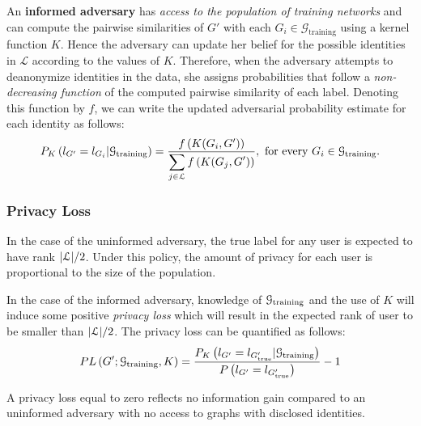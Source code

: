 An \textbf{informed adversary} has \emph{access to the population of training networks} and can compute the pairwise similarities of $ G' $ with each $ G_{i} \in \mathcal{G}_{\text{training}} $ using a kernel function $K$. Hence the adversary can update her belief for the possible identities in $ \mathcal{L} $ according to the values of $K$.
Therefore, when the adversary attempts to deanonymize identities in the data, she assigns probabilities that follow a \emph{non-decreasing function} {of the computed pairwise similarity} of each label.
Denoting this function by $f$, we can write the updated adversarial probability estimate for each identity as follows:
\[
	P_K\left(l_{G'} =l_{G_i}| \mathcal{G}_{\text{training}}\right) =  \frac{f\left(K(G_i, G')\right)}{\displaystyle \sum_{j\in \mathcal{L}}  f\left(K(G_j, G')\right)},   \mbox{ for every }  G_i \in \mathcal{G}_{\text{training}}.
	\label{eq:adversarial_rule}
\]




\subsubsection{Privacy Loss}

In the case of the uninformed adversary, the true label for any user is expected to have rank $ |\mathcal{L}|/2$. Under this policy, the amount of privacy for each user is proportional to the size of the population.

In the case of the informed adversary, knowledge of $ \mathcal{G}_\text{training} $ and the use of $ K $ will induce some positive \emph{privacy loss} which will result in the expected rank of user to be smaller than $ |\mathcal{L}|/2$. The privacy loss can be quantified as follows:
\[
	PL\left(G';\mathcal{G}_{\text{training}}, K\right) = \frac{P_K\left(l_{G'}= l_{G'_\text{true}}|\mathcal{G}_{\text{training}}\right)}{P\left(l_{G'}= l_{G'_\text{true}}\right)} -1
	\label{eq:privloss}
\]

A privacy loss equal to zero reflects no information gain compared to an uninformed adversary with no access to graphs with disclosed identities.

